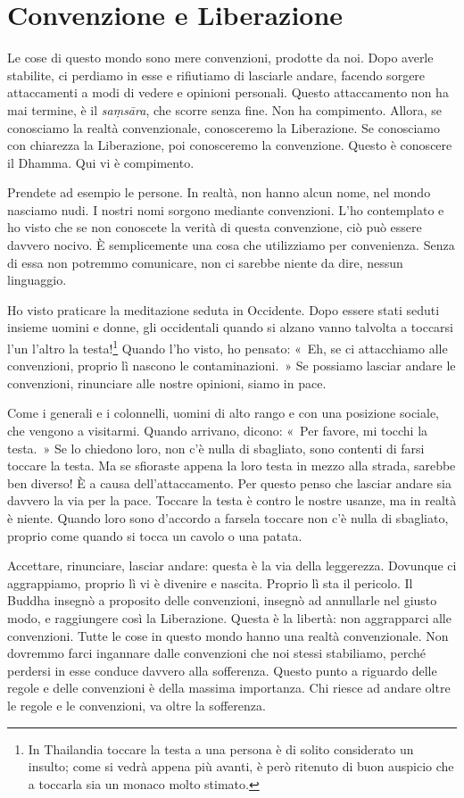\chapter{Convenzione e Liberazione}

Le cose di questo mondo sono mere convenzioni, prodotte da noi. Dopo
averle stabilite, ci perdiamo in esse e rifiutiamo di lasciarle andare,
facendo sorgere attaccamenti a modi di vedere e opinioni personali.
Questo attaccamento non ha mai termine, è il \emph{saṃsāra}, che scorre
senza fine. Non ha compimento. Allora, se conosciamo la realtà
convenzionale, conosceremo la Liberazione. Se conosciamo con chiarezza
la Liberazione, poi conosceremo la convenzione. Questo è conoscere il
Dhamma. Qui vi è compimento.

Prendete ad esempio le persone. In realtà, non hanno alcun nome, nel
mondo nasciamo nudi. I nostri nomi sorgono mediante convenzioni. L'ho
contemplato e ho visto che se non conoscete la verità di questa
convenzione, ciò può essere davvero nocivo. È semplicemente una cosa che
utilizziamo per convenienza. Senza di essa non potremmo comunicare, non
ci sarebbe niente da dire, nessun linguaggio.

Ho visto praticare la meditazione seduta in Occidente. Dopo essere stati
seduti insieme uomini e donne, gli occidentali quando si alzano vanno
talvolta a toccarsi l'un l'altro la testa!\footnote{In Thailandia
  toccare la testa a una persona è di solito considerato un insulto;
  come si vedrà appena più avanti, è però ritenuto di buon auspicio che
  a toccarla sia un monaco molto stimato.} Quando l'ho visto, ho
pensato: «~Eh, se ci attacchiamo alle convenzioni, proprio lì nascono le
contaminazioni.~» Se possiamo lasciar andare le convenzioni, rinunciare
alle nostre opinioni, siamo in pace.

Come i generali e i colonnelli, uomini di alto rango e con una posizione
sociale, che vengono a visitarmi. Quando arrivano, dicono: «~Per favore,
mi tocchi la testa.~» Se lo chiedono loro, non c'è nulla di sbagliato,
sono contenti di farsi toccare la testa. Ma se sfioraste appena la loro
testa in mezzo alla strada, sarebbe ben diverso! È a causa
dell'attaccamento. Per questo penso che lasciar andare sia davvero la
via per la pace. Toccare la testa è contro le nostre usanze, ma in
realtà è niente. Quando loro sono d'accordo a farsela toccare non c'è
nulla di sbagliato, proprio come quando si tocca un cavolo o una patata.

Accettare, rinunciare, lasciar andare: questa è la via della leggerezza.
Dovunque ci aggrappiamo, proprio lì vi è divenire e nascita. Proprio lì
sta il pericolo. Il Buddha insegnò a proposito delle convenzioni,
insegnò ad annullarle nel giusto modo, e raggiungere così la
Liberazione. Questa è la libertà: non aggrapparci alle convenzioni.
Tutte le cose in questo mondo hanno una realtà convenzionale. Non
dovremmo farci ingannare dalle convenzioni che noi stessi stabiliamo,
perché perdersi in esse conduce davvero alla sofferenza. Questo punto a
riguardo delle regole e delle convenzioni è della massima importanza.
Chi riesce ad andare oltre le regole e le convenzioni, va oltre la
sofferenza.

